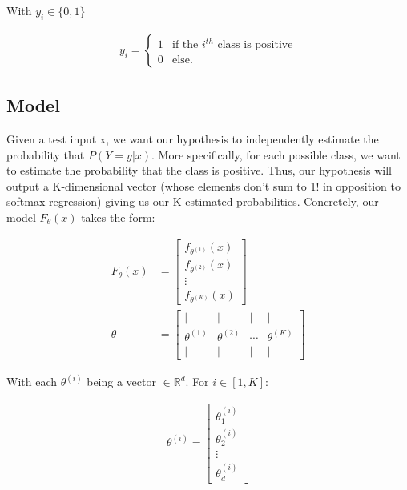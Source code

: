 With $y_{i} \in \{0, 1\}$

\begin{align}
y_{i} = \left\{
    \begin{array}{ll}
        1 & \mbox{if the } i^{th} \mbox{ class is positive} \\
        0 & \mbox{else.}
    \end{array}
\right.
\end{align}

\subsection{Model}

Given a test input x, we want our hypothesis to independently estimate the probability that $P(Y=y | x)$. More specifically, for each possible class, we want to estimate the probability that the class is positive. Thus, our hypothesis will output a K-dimensional vector (whose elements don't sum to 1! in opposition to softmax regression) giving us our K estimated probabilities. Concretely, our model $F_{\theta}(x)$ takes the form:

\begin{align}
	F_\theta(x) 
		&= \begin{bmatrix} 
			f_{\theta^{(1)}}(x) \\ 
			f_{\theta^{(2)}}(x) \\ 
			\vdots \\ 
			f_{\theta^{(K)}}(x) 
		\end{bmatrix} \\
	\theta &= \left[\begin{array}{cccc}| & | & | & | \\ \theta^{(1)} & \theta^{(2)} & \cdots & \theta^{(K)} \\ | & | & | & | \end{array}\right]
\end{align}


With each $\theta^{(i)}$ being a vector $\in \mathbb{R}^{d}$.
For $i \in [1, K]$:

\begin{align}
	\theta^{(i)} = \left[
		\begin{array}{cccc}
			\theta_{1}^{(i)} \\
			\theta_{2}^{(i)} \\
			\vdots \\
			\theta_{d}^{(i)}
		\end{array}\right]
\end{align}


